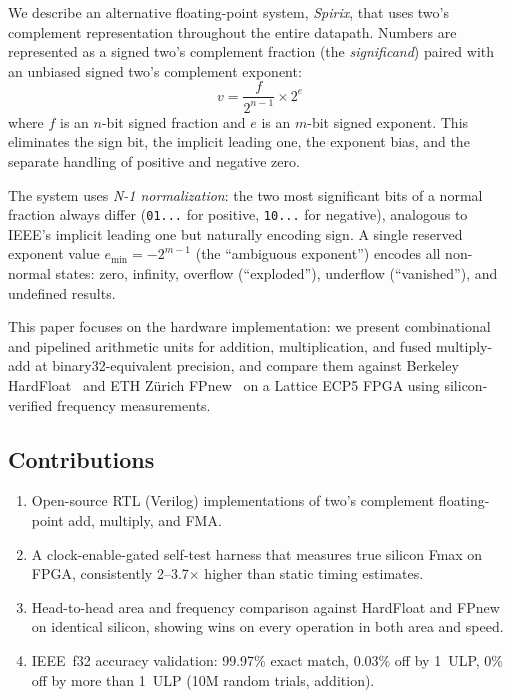 \documentclass[10pt,twocolumn]{article}
\begin{document}
We describe an alternative floating-point system, \emph{Spirix}, that uses
two's complement representation throughout the entire datapath.  Numbers are
represented as a signed two's complement fraction (the \emph{significand})
paired with an unbiased signed two's complement exponent:
\begin{equation}
  v = \frac{f}{2^{n-1}} \times 2^{e}
\end{equation}
where $f$ is an $n$-bit signed fraction and $e$ is an $m$-bit signed
exponent.  This eliminates the sign bit, the implicit leading one, the
exponent bias, and the separate handling of positive and negative zero.

The system uses \emph{N-1 normalization}: the two most significant bits of
a normal fraction always differ (\texttt{01...} for positive, \texttt{10...}
for negative), analogous to IEEE's implicit leading one but naturally
encoding sign.  A single reserved exponent value $e_{\min} = -2^{m-1}$
(the ``ambiguous exponent'') encodes all non-normal states: zero, infinity,
overflow (``exploded''), underflow (``vanished''), and undefined results.

This paper focuses on the hardware implementation: we present combinational
and pipelined arithmetic units for addition, multiplication, and fused
multiply-add at binary32-equivalent precision, and compare them against
Berkeley HardFloat~\cite{hardFloat} and ETH Z\"urich FPnew~\cite{fpnew}
on a Lattice ECP5 FPGA using silicon-verified frequency measurements.

\subsection{Contributions}

\begin{enumerate}
  \item Open-source RTL (Verilog) implementations of two's complement
        floating-point add, multiply, and FMA.
  \item A clock-enable-gated self-test harness that measures true silicon
        Fmax on FPGA, consistently 2--3.7$\times$ higher than static
        timing estimates.
  \item Head-to-head area and frequency comparison against HardFloat and
        FPnew on identical silicon, showing wins on every operation in both
        area and speed.
  \item IEEE~f32 accuracy validation: 99.97\% exact match, 0.03\% off by
        1~ULP, 0\% off by more than 1~ULP (10M random trials, addition).
\end{enumerate}
\end{document}
